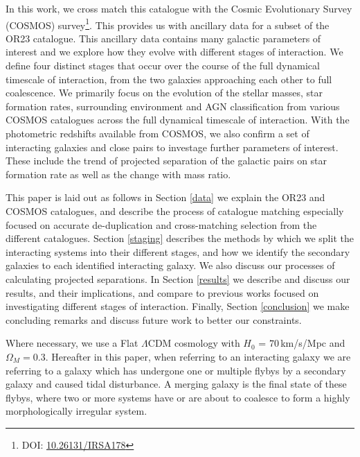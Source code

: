 \documentclass[fleqn,usenatbib]{mnras}
\begin{document}
In this work, we cross match this catalogue with the Cosmic Evolutionary Survey (COSMOS) survey\footnote{DOI: \href{https://www.ipac.caltech.edu/doi/irsa/10.26131/IRSA178}{10.26131/IRSA178}}. This provides us with ancillary data for a subset of the OR23 catalogue. This ancillary data contains many galactic parameters of interest and we explore how they evolve with different stages of interaction. We define four distinct stages that occur over the course of the full dynamical timescale of interaction, from the two galaxies approaching each other to full coalescence. We primarily focus on the evolution of the stellar masses, star formation rates, surrounding environment and AGN classification from various COSMOS catalogues across the full dynamical timescale of interaction. With the photometric redshifts available from COSMOS, we also confirm a set of interacting galaxies and close pairs to investage further parameters of interest. These include the trend of projected separation of the galactic pairs on star formation rate as well as the change with mass ratio.


This paper is laid out as follows in Section \ref{data} we explain the OR23 and COSMOS catalogues, and describe the process of catalogue matching especially focused on accurate de-duplication and cross-matching selection from the different catalogues.  Section \ref{staging} describes the methods by which we split the interacting systems into their different stages, and how we identify the secondary galaxies to each identified interacting galaxy. We also discuss our processes of calculating projected separations. In Section \ref{results} we describe and discuss our results, and their implications, and compare to previous works focused on investigating different stages of interaction. Finally, Section \ref{conclusion} we make concluding remarks and discuss future work to better our constraints. 

Where necessary, we use a Flat $\Lambda$CDM cosmology with $H_0$ = $70$\,km/s/Mpc and $\Omega_M = 0.3$. Hereafter in this paper, when referring to an interacting galaxy we are referring to a galaxy which has undergone one or multiple flybys by a secondary galaxy and caused tidal disturbance. A merging galaxy is the final state of these flybys, where two or more systems have or are about to coalesce to form a highly morphologically irregular system.
\end{document}
